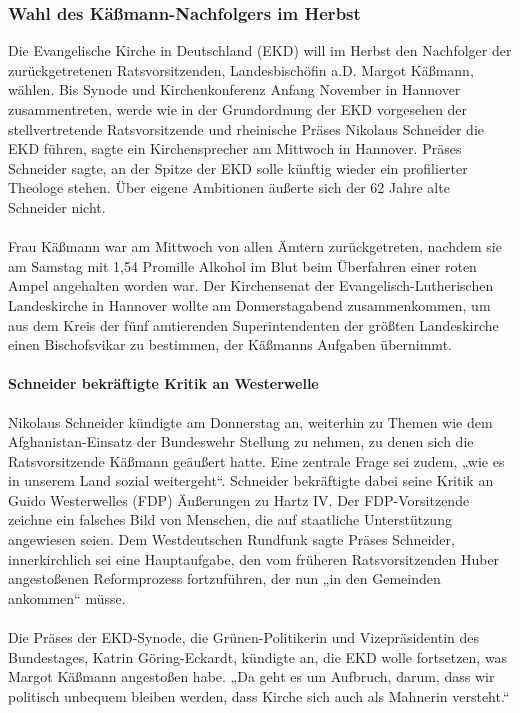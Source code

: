 \documentclass[a4paper,12pt,oneside]{scrbook}
\begin{document}
\subsubsection{Wahl des Käßmann-Nachfolgers im Herbst}
Die Evangelische Kirche in Deutschland (EKD) will im Herbst den Nachfolger der zurückgetretenen Ratsvorsitzenden, Landesbischöfin a.D. Margot Käßmann, wählen. Bis Synode und Kirchenkonferenz Anfang November in Hannover zusammentreten, werde wie in der Grundordnung der EKD vorgesehen der stellvertretende Ratsvorsitzende und rheinische Präses Nikolaus Schneider die EKD führen, sagte ein Kirchensprecher am Mittwoch in Hannover. Präses Schneider sagte, an der Spitze der EKD solle künftig wieder ein profilierter Theologe stehen. Über eigene Ambitionen äußerte sich der 62 Jahre alte Schneider nicht.
\\\\
Frau Käßmann war am Mittwoch von allen Ämtern zurückgetreten, nachdem sie am Samstag mit 1,54 Promille Alkohol im Blut beim Überfahren einer roten Ampel angehalten worden war. Der Kirchensenat der Evangelisch-Lutherischen Landeskirche in Hannover wollte am Donnerstagabend zusammenkommen, um aus dem Kreis der fünf amtierenden Superintendenten der größten Landeskirche einen Bischofsvikar zu bestimmen, der Käßmanns Aufgaben übernimmt.
\paragraph{Schneider bekräftigte Kritik an Westerwelle}
Nikolaus Schneider kündigte am Donnerstag an, weiterhin zu Themen wie dem Afghanistan-Einsatz der Bundeswehr Stellung zu nehmen, zu denen sich die Ratsvorsitzende Käßmann geäußert hatte. Eine zentrale Frage sei zudem, „wie es in unserem Land sozial weitergeht“. Schneider bekräftigte dabei seine Kritik an Guido Westerwelles (FDP) Äußerungen zu Hartz IV. Der FDP-Vorsitzende zeichne ein falsches Bild von Menschen, die auf staatliche Unterstützung angewiesen seien. Dem Westdeutschen Rundfunk sagte Präses Schneider, innerkirchlich sei eine Hauptaufgabe, den vom früheren Ratsvorsitzenden Huber angestoßenen Reformprozess fortzuführen, der nun „in den Gemeinden ankommen“ müsse.
\\\\
Die Präses der EKD-Synode, die Grünen-Politikerin und Vizepräsidentin des Bundestages, Katrin Göring-Eckardt, kündigte an, die EKD wolle fortsetzen, was Margot Käßmann angestoßen habe. „Da geht es um Aufbruch, darum, dass wir politisch unbequem bleiben werden, dass Kirche sich auch als Mahnerin versteht.“
\end{document}
